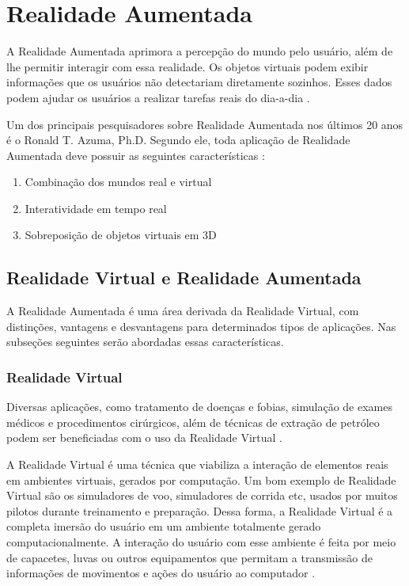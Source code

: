 \chapter{Realidade Aumentada}
\label{chapter:principios_ra}



A Realidade Aumentada aprimora a percepção do mundo pelo usuário, além de
lhe permitir interagir com essa realidade. Os objetos virtuais podem 
exibir informações que os usuários não detectariam diretamente sozinhos.
Esses dados podem ajudar os usuários a realizar tarefas reais do dia-a-dia
\cite{SurveyAR}.


Um dos principais pesquisadores sobre Realidade Aumentada nos últimos 20 anos
é o Ronald T. Azuma, Ph.D. Segundo ele, toda aplicação de Realidade Aumentada deve possuir
as seguintes características \cite{SurveyAR}:


\begin{enumerate}
    \item Combinação dos mundos real e virtual
    \item Interatividade em tempo real
    \item Sobreposição de objetos virtuais em 3D
\end{enumerate}







\section{Realidade Virtual e Realidade Aumentada}

A Realidade Aumentada é uma área derivada da Realidade Virtual, com distinções,
vantagens e desvantagens para determinados tipos de aplicações. Nas subseções 
seguintes serão abordadas essas características.


\subsection{Realidade Virtual}


Diversas aplicações, como tratamento de doenças e fobias, simulação de exames
médicos e procedimentos cirúrgicos, além de técnicas de extração de petróleo
podem ser beneficiadas com o uso da Realidade Virtual \cite{ARColaborativa}.


A Realidade Virtual é uma técnica que viabiliza a interação de elementos reais em ambientes
virtuais, gerados por computação. 
Um bom exemplo de Realidade Virtual são os simuladores de voo, simuladores de corrida etc, usados
por muitos pilotos durante treinamento e preparação.
Dessa forma, a Realidade Virtual é a completa imersão do usuário em um ambiente totalmente
gerado computacionalmente. A interação do usuário com esse ambiente é feita por meio de capacetes,
luvas ou outros equipamentos que permitam a transmissão de informações de movimentos e ações 
do usuário ao computador \cite{ARColaborativa}.


